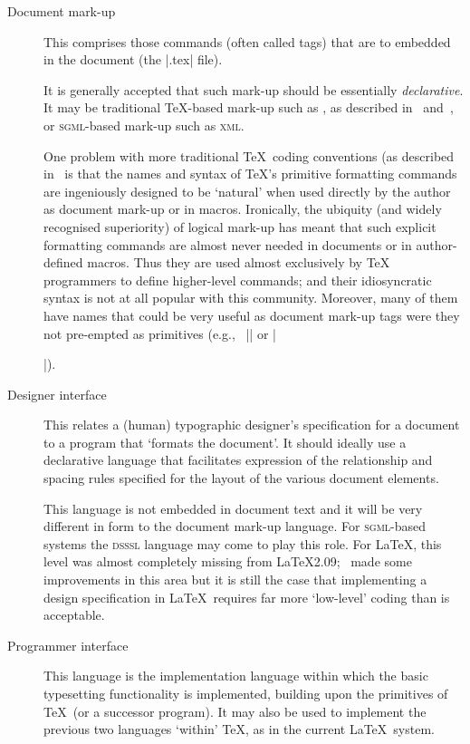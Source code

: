 \documentclass{article}
\providecommand \acro [1]{\textsc{\MakeLowercase{#1}}}
\providecommand \eg {e.g.,~}
\begin{document}
\begin{description}
\item[Document mark-up] This comprises those commands (often called tags)
  that are to embedded in the document (the |.tex| file).

  It is generally accepted that such mark-up should be essentially
  \emph{declarative}.
  It may be traditional \TeX-based mark-up such as
  \LaTeXe, as described in~\cite{A-W:LLa94} and~\cite{A-W:GMS94},
  or \acro{SGML}-based mark-up such as \acro{XML}.
  
  One problem with more traditional \TeX\ coding conventions (as
  described in~\cite{A-W:K-TB} is that the names and syntax of \TeX's
  primitive formatting commands are ingeniously designed to be
  `natural' when used directly by the author as document mark-up or in
  macros.  Ironically, the ubiquity (and widely recognised
  superiority) of logical mark-up has meant that such explicit
  formatting commands are almost never needed in documents or in
  author-defined macros.  Thus they are used almost exclusively by
  \TeX{} programmers to define higher-level commands; and their
  idiosyncratic syntax is not at all popular with this community.
  Moreover, many of them have names that could be very useful as
  document mark-up tags were they not pre-empted as primitives (\eg
  |\box| or |\special|).
  
\item[Designer interface] This relates a (human) typographic
  designer's specification for a document to a program that `formats
  the document'.  It should ideally use a declarative language that
  facilitates expression of the relationship and spacing rules specified
  for the layout of the various document elements.

  This language is not embedded in document text and it will be very
  different in form to the document mark-up language.  For
  \acro{SGML}-based systems the \acro{DSSSL} language may come to play
  this role.  For \LaTeX, this level was almost completely missing
  from \LaTeX2.09; \LaTeXe\ made some improvements in this area but it
  is still the case that implementing a design specification in
  \LaTeX\ requires far more `low-level' coding than is acceptable.
\item[Programmer interface] 
  This language is the implementation
  language within which the basic typesetting functionality is
  implemented, building upon the primitives of \TeX\ (or a
  successor program).
  It may also be used to implement the previous
  two languages `within' \TeX, as in the current \LaTeX\ system.
\end{description}
\end{document}
